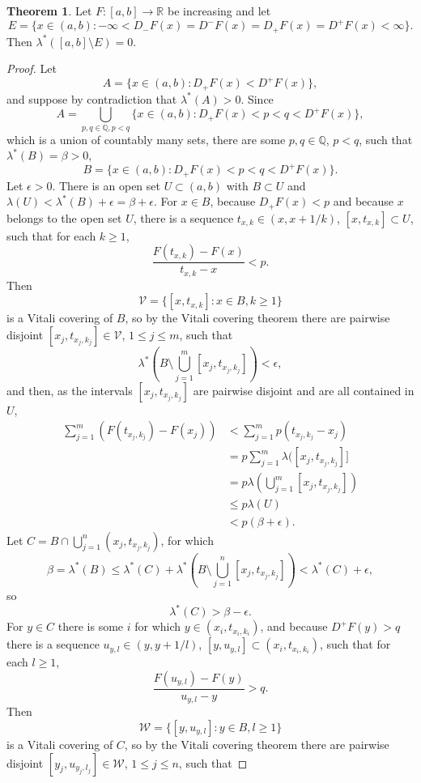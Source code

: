 \documentclass{article}
\theoremstyle{definition}
\newtheorem{theorem}{Theorem}
\theoremstyle{definition}
\begin{document}
\begin{theorem}
Let $F:[a,b] \to \mathbb{R}$ be increasing and let
\[
E = \{x \in (a,b) : -\infty<D_-F(x) = D^-F(x) = D_+F(x) = D^+F(x) <\infty\}.
\]
Then $\lambda^*([a,b] \setminus E) = 0$.
\end{theorem}
\begin{proof}
Let
\[
A = \{x \in (a,b) : D_+F(x) < D^+F(x)\},
\]
and suppose by contradiction that $\lambda^*(A)>0$. Since
\[
A = \bigcup_{p,q \in \mathbb{Q}, p<q}  \{x \in (a,b) : D_+F(x) <p<q< D^+F(x)\},
\]
which is a union of countably many sets, there are some $p,q \in \mathbb{Q}$, $p<q$, such that $\lambda^*(B)=\beta>0$, 
\[
B = \{x \in (a,b) : D_+F(x) <p<q< D^+F(x)\}.
\]
Let $\epsilon>0$. There is an open set $U \subset (a,b)$ with $B \subset U$ and $\lambda(U) < \lambda^*(B)+\epsilon=
\beta+\epsilon$. 
For $x \in B$, because $D_+F(x)<p$ and because $x$ belongs to the open set $U$, there is a sequence
$t_{x,k} \in (x,x+1/k)$, $[x,t_{x,k}] \subset U$, such that for each $k \geq 1$,
\[
\frac{F(t_{x,k})-F(x)}{t_{x,k}-x} < p.
\]
Then
\[
\mathcal{V} = \{[x,t_{x,k}]:x \in B, k \geq 1\}
\]
is a Vitali covering of $B$, so by the Vitali covering theorem there are 
pairwise disjoint $[x_j,t_{x_j,k_j}] \in \mathcal{V}$, $1 \leq j \leq m$, such that
\[
\lambda^* \left( B \setminus \bigcup_{j=1}^m [x_j,t_{x_j,k_j}] \right)<\epsilon,
\]
and then, as the intervals $[x_j,t_{x_j,k_j}]$ are pairwise disjoint and are all contained in $U$,
\begin{align*}
\sum_{j=1}^m (F(t_{x_j,k_j})-F(x_j)) &< \sum_{j=1}^m p(t_{x_j,k_j}-x_j)\\
&=p\sum_{j=1}^m \lambda([x_j,t_{x_j,k_j}]]\\
&=p\lambda\left( \bigcup_{j=1}^m [x_j,t_{x_j,k_j}]\right)\\
&\leq p \lambda(U)\\
&< p(\beta+\epsilon).
\end{align*}
Let $C=B \cap \bigcup_{j=1}^n (x_j,t_{x_j,k_j})$, for which
\[
\beta=\lambda^*(B) \leq \lambda^*(C) + \lambda^* \left( B \setminus \bigcup_{j=1}^n [x_j,t_{x_j,k_j}] \right)
< \lambda^*(C) + \epsilon,
\]
so
\[
\lambda^*(C)>\beta-\epsilon.
\] 
For $y \in C$ there is some  $i$ for which $y \in (x_i,t_{x_i,k_i})$, and 
because $D^+F(y)>q$ there is a sequence $u_{y,l} \in (y,y+1/l)$,
$[y,u_{y,l}] \subset (x_i,t_{x_i,k_i})$, such that for each $l \geq 1$,
\[
\frac{F(u_{y,l})-F(y)}{u_{y,l}-y} > q.
\]
Then
\[
\mathcal{W} = \{[y,u_{y,l}]: y \in B, l \geq 1\}
\]
is a Vitali covering of $C$, so by the Vitali covering theorem there are
pairwise disjoint $[y_j,u_{y_j,l_j}] \in \mathcal{W}$, $1 \leq j \leq n$, such that

\end{proof}
\end{document}
